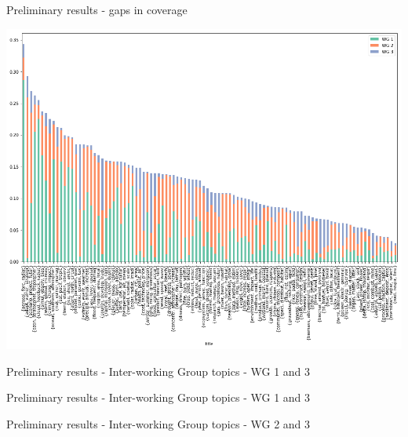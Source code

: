 \documentclass[9pt]{beamer}
\begin{document}
\begin{frame}{Preliminary results - gaps in coverage}


			\includegraphics[width=0.8\linewidth]{../plots/ipcc_topics_wg_386.png}


\end{frame}


\begin{frame}{Preliminary results - Inter-working Group topics - WG 1 and 3}

\begin{table}
	
	
	
	
\end{table}

\end{frame}


\begin{frame}{Preliminary results - Inter-working Group topics - WG 1 and 3}

\begin{table}




\end{table}

\end{frame}


\begin{frame}{Preliminary results - Inter-working Group topics - WG 2 and 3}

\begin{table}




\end{table}

\end{frame}
\end{document}

